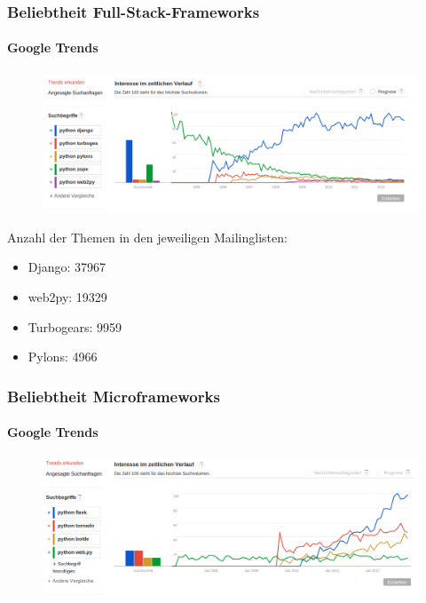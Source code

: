 \documentclass[
    t,
    smaller,
    compress,
    xcolor=svgnames,            %
    table,
]{beamer}
\begin{document}
\begin{frame}
  \frametitle{Beliebtheit Full-Stack-Frameworks}
  \framesubtitle{Google Trends}
	\vspace{-12pt}
     \begin{figure}
         \includegraphics[width=1.0\textwidth]{trends.png}
                   
     \end{figure}
     \vspace{-12pt}
     Anzahl der Themen in den jeweiligen Mailinglisten:
     \vspace{8pt}
      \begin{itemize}[<1->]
     	\item Django: 37967
     	\item web2py: 19329
     	\item Turbogears: 9959
     	\item Pylons: 4966
     \end{itemize}

\end{frame}

\begin{frame}
  \frametitle{Beliebtheit Microframeworks}
  \framesubtitle{Google Trends}

     
      \begin{figure}
         \includegraphics[width=1.0\textwidth]{trends-micro.png}
                   
     \end{figure}

\end{frame}
\end{document}
